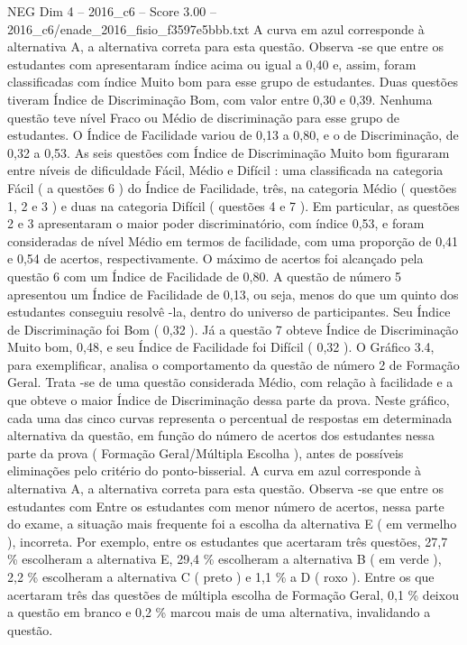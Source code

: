 \begin{textsample}{NEG Dim 4 – 2016\_c6 – Score 3.00 – 2016\_c6/enade\_2016\_fisio\_f3597e5bbb.txt}
A curva em azul corresponde à alternativa A, a alternativa correta para esta questão.
Observa -se que entre os estudantes com apresentaram índice acima ou igual a 0,40 e, assim, foram classificadas com índice Muito bom para esse grupo de estudantes.
Duas questões tiveram Índice de Discriminação Bom, com valor entre 0,30 e 0,39.
Nenhuma questão teve nível Fraco ou Médio de discriminação para esse grupo de estudantes.
O Índice de Facilidade variou de 0,13 a 0,80, e o de Discriminação, de 0,32 a 0,53.
As seis questões com Índice de Discriminação Muito bom figuraram entre níveis de dificuldade Fácil, Médio e Difícil : uma classificada na categoria Fácil ( a questões 6 ) do Índice de Facilidade, três, na categoria Médio ( questões 1, 2 e 3 ) e duas na categoria Difícil ( questões 4 e 7 ).
Em particular, as questões 2 e 3 apresentaram o maior poder discriminatório, com índice 0,53, e foram consideradas de nível Médio em termos de facilidade, com uma proporção de 0,41 e 0,54 de acertos, respectivamente.
O máximo de acertos foi alcançado pela questão 6 com um Índice de Facilidade de 0,80.
A questão de número 5 apresentou um Índice de Facilidade de 0,13, ou seja, menos do que um quinto dos estudantes conseguiu resolvê -la, dentro do universo de participantes.
Seu Índice de Discriminação foi Bom ( 0,32 ).
Já a questão 7 obteve Índice de Discriminação Muito bom, 0,48, e seu Índice de Facilidade foi Difícil ( 0,32 ).
O Gráfico 3.4, para exemplificar, analisa o comportamento da questão de número 2 de Formação Geral.
Trata -se de uma questão considerada Médio, com relação à facilidade e a que obteve o maior Índice de Discriminação dessa parte da prova.
Neste gráfico, cada uma das cinco curvas representa o percentual de respostas em determinada alternativa da questão, em função do número de acertos dos estudantes nessa parte da prova ( Formação Geral/Múltipla Escolha ), antes de possíveis eliminações pelo critério do ponto-bisserial.
A curva em azul corresponde à alternativa A, a alternativa correta para esta questão.
Observa -se que entre os estudantes com Entre os estudantes com menor número de acertos, nessa parte do exame, a situação mais frequente foi a escolha da alternativa E ( em vermelho ), incorreta.
Por exemplo, entre os estudantes que acertaram três questões, 27,7 \% escolheram a alternativa E, 29,4 \% escolheram a alternativa B ( em verde ), 2,2 \% escolheram a alternativa C ( preto ) e 1,1 \% a D ( roxo ).
Entre os que acertaram três das questões de múltipla escolha de Formação Geral, 0,1 \% deixou a questão em branco e 0,2 \% marcou mais de uma alternativa, invalidando a questão.

\end{textsample}
